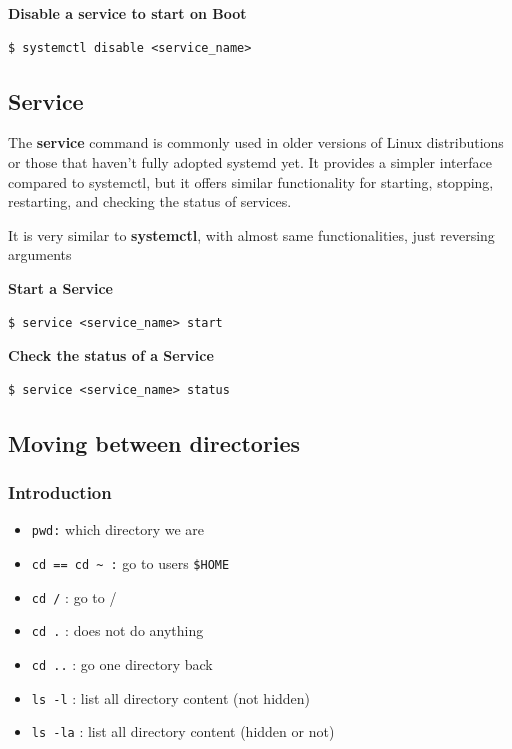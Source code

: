 \documentclass{article}
\newenvironment{codetemplate}[1][]{%
  \mybasecolorbox[#1]
  \itshape
}{%
  \endmybasecolorbox
}
\begin{document}
\textbf{Disable a service to start on Boot}
\begin{codetemplate}{}
\begin{verbatim}
$ systemctl disable <service_name>
\end{verbatim}
\end{codetemplate}

\subsection{Service}

The \textbf{service} command is commonly used in older versions of Linux distributions or those that haven't fully adopted systemd yet. It provides a simpler interface compared to systemctl, but it offers similar functionality for starting, stopping, restarting, and checking the status of services.

It is very similar to \textbf{systemctl}, with almost same functionalities, just reversing arguments

\textbf{Start a Service}
\begin{codetemplate}{}
\begin{verbatim}
$ service <service_name> start
\end{verbatim}
\end{codetemplate}

\textbf{Check the status of a Service}
\begin{codetemplate}{}
\begin{verbatim}
$ service <service_name> status
\end{verbatim}
\end{codetemplate}

\subsection{Moving between directories}
\subsubsection{Introduction}
\begin{itemize}
    \item \verb+pwd:+ which directory we are
    \item \verb+cd == cd ~ :+ go to users \verb+$HOME+
    \item \verb+cd /+ : go to /
    \item \verb+cd .+ : does not do anything
    \item \verb+cd ..+ : go one directory back
    \item \verb+ls -l+ : list all directory content (not hidden)
    \item \verb+ls -la+ : list all directory content (hidden or not)
\end{itemize}
\end{document}
